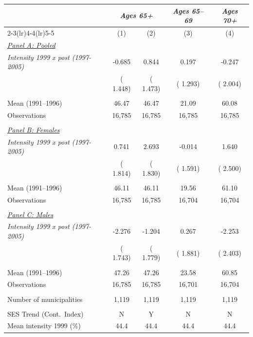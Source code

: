\begin{tabular}{lcccc} \hline \hline
& \multicolumn{2}{c}{\textit{Ages 65+}} & \multicolumn{1}{c}{\textit{Ages 65--69}} & \multicolumn{1}{c}{\textit{Ages 70+}} \\ \cmidrule(lr){2-3}\cmidrule(lr){4-4}\cmidrule(lr){5-5}
& \multicolumn{1}{c}{(1)} & \multicolumn{1}{c}{(2)} & \multicolumn{1}{c}{(3)} & \multicolumn{1}{c}{(4)} \\ \toprule
\underline{\textit{Panel A: Pooled}}  \\ 
\textit{Intensity 1999 x post (1997-2005)} &       -0.685 &        0.844 &        0.197 &       -0.247 \\ 
 & (       1.448) & (       1.473) & (       1.293) & (       2.004) \\ 
  & & & & \\ 
Mean (1991--1996) &        46.47 &        46.47 &        21.09 &        60.08 \\ 
Observations &       16,785 &       16,785 &       16,785 &       16,785 \\ 
  & & & & \\ 
\underline{\textit{Panel B: Females}}  \\ 
\textit{Intensity 1999 x post (1997-2005)} &        0.741 &        2.693 &       -0.014 &        1.640 \\ 
 & (       1.814) & (       1.830) & (       1.591) & (       2.500) \\ 
  & & & & \\ 
Mean (1991--1996) &        46.11 &        46.11 &        19.56 &        61.10 \\ 
Observations &       16,785 &       16,785 &       16,704 &       16,704 \\ 
  & & & & \\ 
\underline{\textit{Panel C: Males}}  \\ 
\textit{Intensity 1999 x post (1997-2005)} &       -2.276 &       -1.204 &        0.267 &       -2.253 \\ 
 & (       1.743) & (       1.779) & (       1.881) & (       2.403) \\ 
  & & & & \\ 
Mean (1991--1996) &        47.26 &        47.26 &        23.58 &        60.85 \\ 
Observations &       16,785 &       16,785 &       16,701 &       16,704 \\ 
  & & & & \\ 
Number of municipalities &        1,119 &        1,119 &        1,119 &        1,119 \\ 
  & & & & \\ 
SES Trend (Cont.\ Index) & N & Y & N & N \\ 
Mean intensity 1999 (\%) &   44.4 &   44.4 &   44.4 &   44.4 \\ 
\bottomrule
\end{tabular}